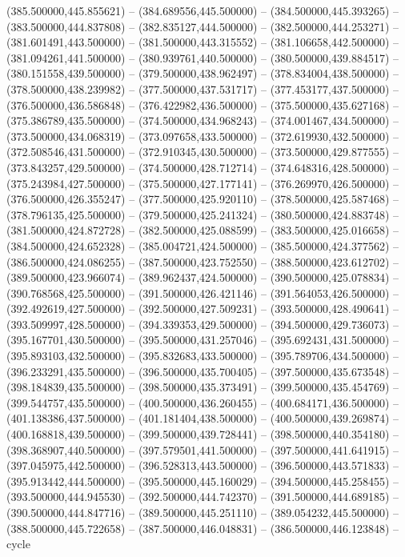    (385.500000,445.855621) -- (384.689556,445.500000) -- (384.500000,445.393265) -- (383.500000,444.837808) -- (382.835127,444.500000) -- (382.500000,444.253271) -- (381.601491,443.500000) -- (381.500000,443.315552) -- (381.106658,442.500000) -- (381.094261,441.500000) -- (380.939761,440.500000) -- (380.500000,439.884517) -- (380.151558,439.500000) -- (379.500000,438.962497) -- (378.834004,438.500000) -- (378.500000,438.239982) -- (377.500000,437.531717) -- (377.453177,437.500000) -- (376.500000,436.586848) -- (376.422982,436.500000) -- (375.500000,435.627168) -- (375.386789,435.500000) -- (374.500000,434.968243) -- (374.001467,434.500000) -- (373.500000,434.068319) -- (373.097658,433.500000) -- (372.619930,432.500000) -- (372.508546,431.500000) -- (372.910345,430.500000) -- (373.500000,429.877555) -- (373.843257,429.500000) -- (374.500000,428.712714) -- (374.648316,428.500000) -- (375.243984,427.500000) -- (375.500000,427.177141) -- (376.269970,426.500000) -- (376.500000,426.355247) -- (377.500000,425.920110) -- (378.500000,425.587468) -- (378.796135,425.500000) -- (379.500000,425.241324) -- (380.500000,424.883748) -- (381.500000,424.872728) -- (382.500000,425.088599) -- (383.500000,425.016658) -- (384.500000,424.652328) -- (385.004721,424.500000) -- (385.500000,424.377562) -- (386.500000,424.086255) -- (387.500000,423.752550) -- (388.500000,423.612702) -- (389.500000,423.966074) -- (389.962437,424.500000) -- (390.500000,425.078834) -- (390.768568,425.500000) -- (391.500000,426.421146) -- (391.564053,426.500000) -- (392.492619,427.500000) -- (392.500000,427.509231) -- (393.500000,428.490641) -- (393.509997,428.500000) -- (394.339353,429.500000) -- (394.500000,429.736073) -- (395.167701,430.500000) -- (395.500000,431.257046) -- (395.692431,431.500000) -- (395.893103,432.500000) -- (395.832683,433.500000) -- (395.789706,434.500000) -- (396.233291,435.500000) -- (396.500000,435.700405) -- (397.500000,435.673548) -- (398.184839,435.500000) -- (398.500000,435.373491) -- (399.500000,435.454769) -- (399.544757,435.500000) -- (400.500000,436.260455) -- (400.684171,436.500000) -- (401.138386,437.500000) -- (401.181404,438.500000) -- (400.500000,439.269874) -- (400.168818,439.500000) -- (399.500000,439.728441) -- (398.500000,440.354180) -- (398.368907,440.500000) -- (397.579501,441.500000) -- (397.500000,441.641915) -- (397.045975,442.500000) -- (396.528313,443.500000) -- (396.500000,443.571833) -- (395.913442,444.500000) -- (395.500000,445.160029) -- (394.500000,445.258455) -- (393.500000,444.945530) -- (392.500000,444.742370) -- (391.500000,444.689185) -- (390.500000,444.847716) -- (389.500000,445.251110) -- (389.054232,445.500000) -- (388.500000,445.722658) -- (387.500000,446.048831) -- (386.500000,446.123848) -- cycle
